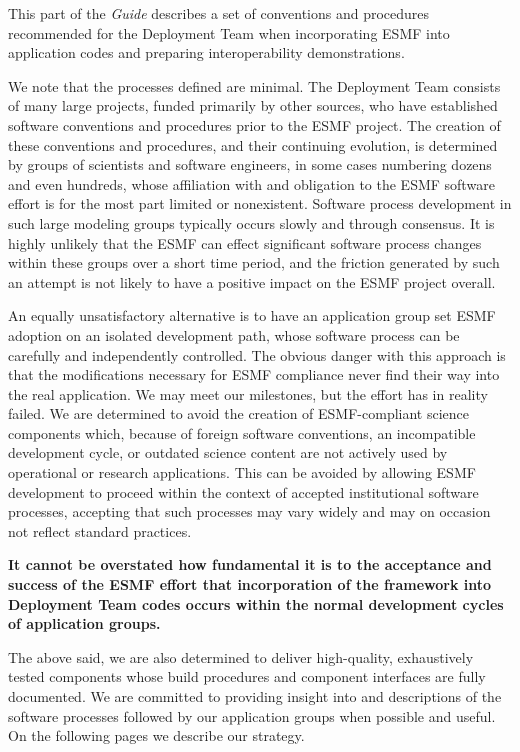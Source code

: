 
This part of the {\it Guide} describes a set of conventions and
procedures recommended for the Deployment Team when incorporating
ESMF into application codes and preparing interoperability 
demonstrations.

We note that the processes defined are minimal.  The Deployment Team 
consists of many large projects, funded primarily by other sources, who have 
established software conventions and procedures prior to the ESMF project.
The creation of these conventions and procedures, and their continuing 
evolution, is determined by groups of scientists and software engineers, 
in some cases numbering dozens and even hundreds, whose affiliation with
and obligation to the ESMF software effort is for the most part limited 
or nonexistent.
Software process development in such large modeling groups typically 
occurs slowly and through consensus.  It is highly unlikely that the 
ESMF can effect significant software process changes within these groups
over a short time period, and the friction generated by such an attempt
is not likely to have a positive impact on the ESMF project overall.

An equally unsatisfactory alternative is to have an application group
set ESMF adoption on an isolated development 
path, whose software process can be carefully and independently controlled.  
The obvious danger with this approach is that the modifications 
necessary for ESMF compliance never 
find their way into the real application.  We may meet our milestones, but
the effort has in reality failed.  We are determined to avoid the creation 
of ESMF-compliant 
science components which, because of foreign software conventions, an 
incompatible development cycle, or outdated science content are not 
actively used by operational or research
applications.  This can be avoided by allowing ESMF development to proceed
within the context of accepted institutional software processes, accepting
that such processes may vary widely and may on occasion not reflect
standard practices.  

{\bf It cannot be overstated how fundamental it is to the 
acceptance and success of the ESMF effort that incorporation of the 
framework into Deployment Team codes occurs within the normal development 
cycles of application groups.}  

The above said, we are also determined to deliver high-quality, 
exhaustively tested components whose build procedures and component 
interfaces are fully documented.  We are committed to providing insight 
into and descriptions of the software processes followed by our application 
groups when possible and useful.  On the following pages we describe our
strategy.





